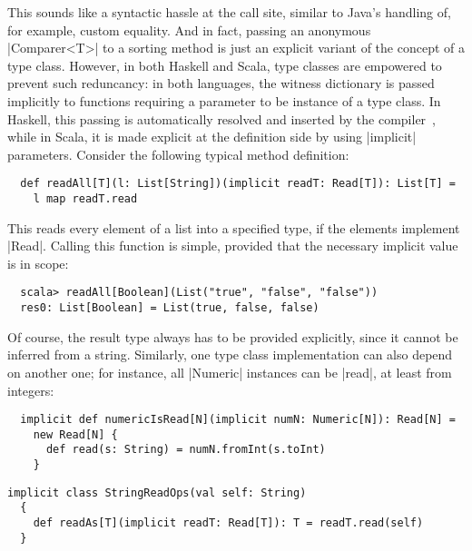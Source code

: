 This sounds like a syntactic hassle at the call site, similar to Java's handling of, for example,
custom equality. And in fact, passing an anonymous |Comparer<T>| to a sorting method is just an
explicit variant of the concept of a type class. However, in both Haskell and Scala, type classes
are empowered to prevent such reduncancy: in both languages, the witness dictionary is passed
implicitly to functions requiring a parameter to be instance of a type class. In Haskell, this
passing is automatically resolved and inserted by the compiler~\cite{hammond1990:type_classes},
while in Scala, it is made explicit at the definition side by using |implicit| parameters. Consider
the following typical method definition:
\begin{lstlisting}
  def readAll[T](l: List[String])(implicit readT: Read[T]): List[T] =
    l map readT.read
\end{lstlisting}
This reads every element of a list into a specified type, if the elements implement |Read|. Calling
this function is simple, provided that the necessary implicit value is in scope:
\begin{lstlisting}
  scala> readAll[Boolean](List("true", "false", "false"))
  res0: List[Boolean] = List(true, false, false)
\end{lstlisting}
Of course, the result type always has to be provided explicitly, since it cannot be inferred from a
string. Similarly, one type class implementation can also depend on another one; for instance, all
|Numeric| instances can be |read|, at least from integers:
\begin{lstlisting}
  implicit def numericIsRead[N](implicit numN: Numeric[N]): Read[N] = 
    new Read[N] {
      def read(s: String) = numN.fromInt(s.toInt)
    }
\end{lstlisting}

\begin{lstlisting}[style=floating, label={lst:read_wrapper},
  caption={Wrapper object for the \lstinline|Read| type class.
    \hfill\github{dsl-examples/blob/master/src/main/scala/dsl_examples/Read.scala}}]
  implicit class StringReadOps(val self: String)
  {
    def readAs[T](implicit readT: Read[T]): T = readT.read(self)
  }
\end{lstlisting}

